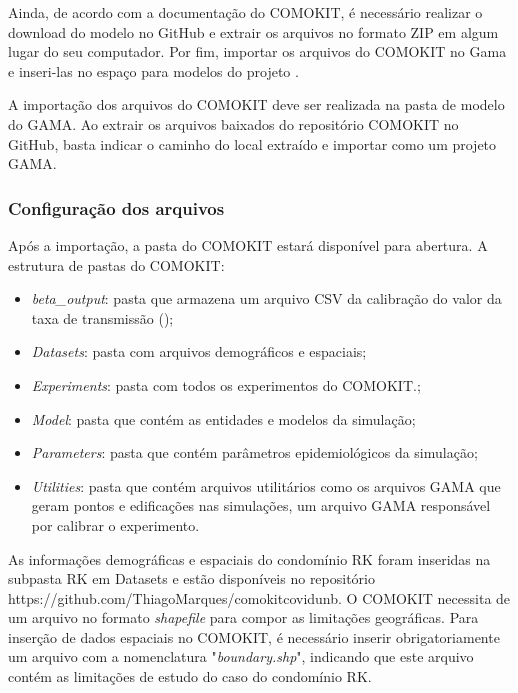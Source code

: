 Ainda, de acordo com a documentação do COMOKIT, é necessário realizar o download do modelo no GitHub e extrair os arquivos no formato ZIP em algum lugar do seu computador. Por fim, importar os arquivos do COMOKIT no Gama e inseri-las no espaço para modelos do projeto \cite{ComokitDoc}.


A importação dos arquivos do COMOKIT deve ser realizada na pasta de modelo do GAMA. Ao extrair os arquivos baixados do repositório COMOKIT no GitHub, basta indicar o caminho do local extraído e importar como um projeto GAMA.


\subsubsection{Configuração dos arquivos}

Após a importação, a pasta do COMOKIT estará disponível para abertura. A estrutura de pastas do COMOKIT:

\begin{itemize}
\item \textit{beta\_output}: pasta que armazena um arquivo CSV da calibração do valor da taxa de transmissão (\β);
\item \textit{Datasets}: pasta com arquivos demográficos e espaciais;
\item \textit{Experiments}: pasta com todos os experimentos do COMOKIT.;
\item \textit{Model}: pasta que contém as entidades e modelos da simulação;
\item \textit{Parameters}: pasta que contém parâmetros epidemiológicos da simulação;
\item \textit{Utilities}: pasta que contém arquivos utilitários como os arquivos GAMA que geram pontos e edificações nas simulações, um arquivo GAMA responsável por calibrar o experimento.
\end{itemize}

As informações demográficas e espaciais do condomínio RK foram inseridas na subpasta RK em Datasets e estão disponíveis no repositório https://github.com/ThiagoMarques/comokitcovidunb. O COMOKIT necessita de um arquivo no formato \textit{shapefile} para compor as limitações geográficas. Para inserção de dados espaciais no COMOKIT, é necessário inserir obrigatoriamente um arquivo com a nomenclatura "\textit{boundary.shp}", indicando que este arquivo contém as limitações de estudo do caso do condomínio RK.

